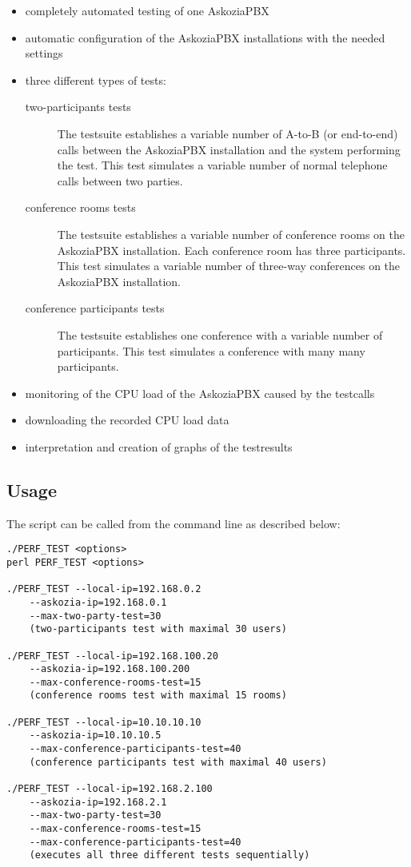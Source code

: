 \begin{itemize}
\item completely automated testing of one AskoziaPBX
\item automatic configuration of the AskoziaPBX installations with the needed settings
\item three different types of tests:
	\begin{description}
	\item [two-participants tests] The testsuite establishes a variable number of A-to-B
	(or end-to-end) calls between the AskoziaPBX installation and the system performing the test.
	This test simulates a variable number of normal telephone calls between two parties.
	
	\item [conference rooms tests] The testsuite establishes a variable number of conference rooms
	on the AskoziaPBX installation. Each conference room has three participants.
	This test simulates a variable number of three-way conferences on the AskoziaPBX installation.

	\item [conference participants tests] The testsuite establishes one conference with a variable
	number of participants. This test simulates a conference with many many participants.
	\end{description}
	
\item monitoring of the CPU load of the AskoziaPBX caused by the testcalls
\item downloading the recorded CPU load data
\item interpretation and creation of graphs of the testresults 
\end{itemize}

\newpage
\subsection{Usage}%
The script can be called from the command line as described below: 

\begin{lstlisting}[breaklines=true,label=code:script-usage,caption={Script usage} ]
./PERF_TEST <options>
perl PERF_TEST <options>

./PERF_TEST --local-ip=192.168.0.2
    --askozia-ip=192.168.0.1
    --max-two-party-test=30
    (two-participants test with maximal 30 users)

./PERF_TEST --local-ip=192.168.100.20
    --askozia-ip=192.168.100.200
    --max-conference-rooms-test=15
    (conference rooms test with maximal 15 rooms)

./PERF_TEST --local-ip=10.10.10.10
    --askozia-ip=10.10.10.5
    --max-conference-participants-test=40
    (conference participants test with maximal 40 users)

./PERF_TEST --local-ip=192.168.2.100
    --askozia-ip=192.168.2.1
    --max-two-party-test=30
    --max-conference-rooms-test=15
    --max-conference-participants-test=40
    (executes all three different tests sequentially)
\end{lstlisting}

